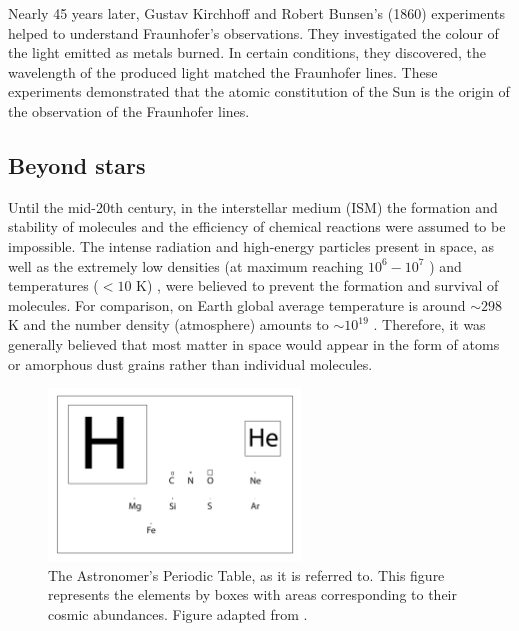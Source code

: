 Nearly 45 years later, Gustav Kirchhoff and Robert Bunsen's \cite{kirchhoff_chemical_1860} (1860) experiments helped to understand Fraunhofer's observations. They investigated the colour of the light emitted as metals burned. In certain conditions, they discovered, the wavelength of the produced light matched the Fraunhofer lines. These experiments demonstrated that the atomic constitution of the Sun is the origin of the observation of the Fraunhofer lines. 

\subsection{Beyond stars}
Until the mid-20th century, in the interstellar medium (ISM) the formation and stability of molecules and the efficiency of chemical reactions were assumed to be impossible. The intense radiation and high-energy particles present in space, as well as the extremely low densities (at maximum reaching $10^6 - 10^7$ \percc) and temperatures ($<10$ K) \cite{harju_detection_2008}, were believed to prevent the formation and survival of molecules. For comparison, on Earth global average temperature is around $\sim 298$ K and the number density (atmosphere) amounts to $\sim 10^{19}$ \percc. Therefore, it was generally believed that most matter in space would appear in the form of atoms or amorphous dust grains rather than individual molecules.

\begin{figure}[!htb]
    \centering
    \includegraphics[width=0.6\textwidth]{figures/intro/astro-periodic-table.png}
    \caption{The Astronomer's Periodic Table, as it is referred to. This figure represents the elements by boxes with areas corresponding to their cosmic abundances. Figure adapted from \citet{mccall_optical_2005}.}
    \label{fig:astrochemistry-astro-periodic-table}
\end{figure}

